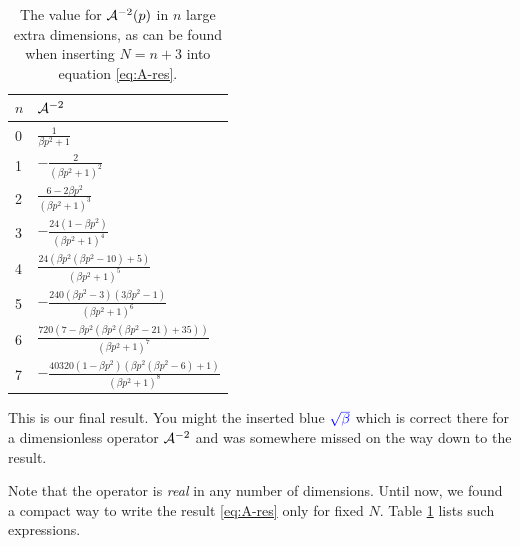 \documentclass[10pt,a4paper]{article}
\begin{document}
\begin{table}
\vspace*{-0.45cm} %
\renewcommand{\arraystretch}{1.8} %
\begin{tabularx}{\textwidth}{ll}
\firsthline
$n$ & ${\cal A}^{-2}$ \\
\hline
 0 & $\frac{1}{\beta  p^2+1}$ \\
 1 & $-\frac{2}{\left(\beta  p^2+1\right)^2}$ \\
 2 & $\frac{6-2 \beta  p^2}{\left(\beta  p^2+1\right)^3}$ \\
 3 & $-\frac{24 \left(1-\beta  p^2\right)}{\left(\beta  p^2+1\right)^4}$ \\
 4 & $\frac{24 \left(\beta  p^2 \left(\beta  p^2-10\right)+5\right)}{\left(\beta  p^2+1\right)^5}$ \\
 5 & $-\frac{240 \left(\beta  p^2-3\right) \left(3 \beta  p^2-1\right)}{\left(\beta  p^2+1\right)^6}$ \\
 6 & $\frac{720 \left(7- \beta  p^2 \left(\beta  p^2 \left(\beta  p^2-21\right)+35\right)\right)}{\left(\beta  p^2+1\right)^7}$ \\
 7 & $-\frac{40320 \left(1-\beta  p^2\right) \left(\beta  p^2 \left(\beta  p^2-6\right)+1\right)}{\left(\beta  p^2+1\right)^8}$ \\
   \hline
\end{tabularx}
\caption{The value for ${\cal A}^{-2}(p)$ in $n$ large extra dimensions, as can be found when inserting $N=n+3$ into equation \eqref{eq:A-res}.
}\label{table:A}
\end{table}
%
This is our final result. You might the inserted blue $\mathcolor{blue}{\sqrt{\beta}}$ which is correct there for a dimensionless operator ${\cal A}^{-2}$ and was somewhere missed on the way down to the result.

Note that the operator is \emph{real} in any number of dimensions. Until now, we found a compact way to write the result \eqref{eq:A-res} only for fixed $N$. Table \ref{table:A} lists such expressions.
\end{document}
